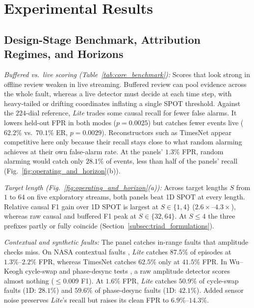 \documentclass[journal]{IEEEtran}
\begin{document}
\section{Experimental Results}
\label{sec:results}



\subsection{Design-Stage Benchmark, Attribution Regimes, and Horizons}
\label{subsec:core_benchmark}
\label{subsec:causal_vs_buffered}
\label{subsec:horizon_latency}
\label{subsec:matched_operating}
\noindent\emph{Buffered vs.\ live scoring (Table~\ref{tab:core_benchmark}):} Scores that look strong in offline review weaken in live streaming. Buffered review can pool evidence across the whole fault, whereas a live detector must decide at each time step, with heavy-tailed or drifting coordinates inflating a single SPOT threshold. Against the $224$-dial reference, \emph{Lite} trades some causal recall for fewer false alarms. It lowers held-out FPR in both modes ($p=0.0025$) but catches fewer events live ($62.2\%$ vs.\ $70.1\%$ ER, $p=0.0029$). Reconstructors such as TimesNet appear competitive here only because their recall stays close to what random alarming achieves at their own false-alarm rate. At the panels' $1.3\%$ FPR, random alarming would catch only $28.1\%$ of events, less than half of the panels' recall (Fig.~\ref{fig:operating_and_horizon}(b)).



\noindent\emph{Target length (Fig.~\ref{fig:operating_and_horizon}(a)):} Across target lengths $S$ from $1$ to $64$ on five exploratory streams, both panels beat 1D SPOT at every length. Relative causal F1 gain over 1D SPOT is largest at $S\in\{1,4\}$ ($2.6\times\text{--}4.3\times$), whereas raw causal and buffered F1 peak at $S\in\{32,64\}$. At $S\le 4$ the three prefixes partly or fully coincide (Section~\ref{subsec:triad_formulations}).

\noindent\emph{Contextual and synthetic faults:} The panel catches in-range faults that amplitude checks miss. On NASA contextual faults \cite{Hundman2018b}, \emph{Lite} catches $87.5\%$ of episodes at $1.3\%\text{--}2.2\%$ FPR, whereas TimesNet catches $62.5\%$ only at $41.5\%$ FPR. In Wu--Keogh cycle-swap and phase-desync tests \cite{wu2023flawed}, a raw amplitude detector scores almost nothing ($\le 0.009$ F1). At $1.6\%$ FPR, \emph{Lite} catches $50.9\%$ of cycle-swap faults (1D: $28.1\%$) and $59.6\%$ of phase-desync faults (1D: $42.1\%$). Added sensor noise preserves \emph{Lite}'s recall but raises its clean FPR to $6.9\%\text{--}14.3\%$.
\end{document}
